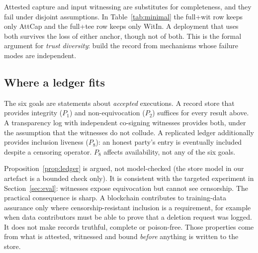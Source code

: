 Attested capture and input witnessing are substitutes for completeness, and they fail
under disjoint assumptions. In Table~\ref{tab:minimal} the full+wit row keeps only
\textsf{AttCap} and the full+tee row keeps only \textsf{WitIn}. A deployment that uses both
survives the loss of either anchor, though not of both. This is the formal argument for
\emph{trust diversity}: build the record from mechanisms whose failure modes are independent.

\subsection{Where a ledger fits}

\begin{proposition}[Ledger]\label{prop:ledger}
The six goals are statements about \emph{accepted} executions. A record store that provides
integrity ($P_1$) and non-equivocation ($P_2$) suffices for every result above. A
transparency log with independent co-signing witnesses provides both, under the assumption
that the witnesses do not collude. A replicated ledger additionally provides inclusion
liveness ($P_8$): an honest party's entry is eventually included despite a censoring
operator. $P_8$ affects availability, not any of the six goals.
\end{proposition}

Proposition~\ref{prop:ledger} is argued, not model-checked (the store model in our
artefact is a bounded check only). It is consistent with the targeted experiment in
Section~\ref{sec:eval}: witnesses expose equivocation but cannot see censorship.
The practical consequence is sharp. A blockchain contributes to training-data assurance
only where censorship-resistant inclusion is a requirement, for example when data
contributors must be able to prove that a deletion request was logged. It does not make
records truthful, complete or poison-free. Those properties come from what is attested,
witnessed and bound \emph{before} anything is written to the store.
